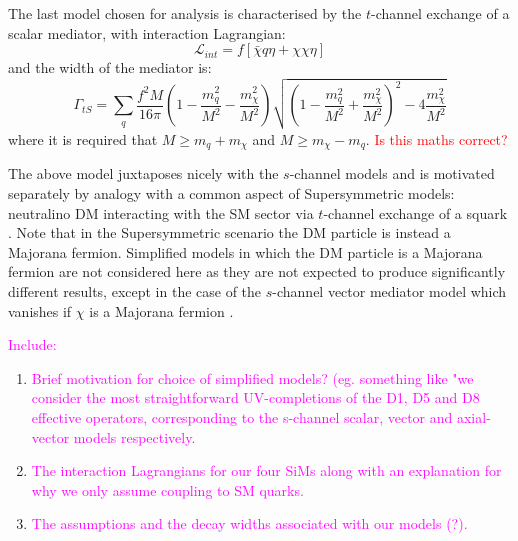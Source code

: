 \begin{flushleft}
\hspace{1cm}The last model chosen for analysis is characterised by the $t$-channel exchange of a scalar mediator, with interaction Lagrangian:
\begin{equation}
\label{L_int_tS}
\mathcal{L}_{int} = f \left[\bar{\chi}q\eta + \chi\chi\eta\right]
\end{equation}
and the width of the mediator is: 
\begin{equation}
\label{gamma_tS}
\Gamma_{tS} = \sum_{\substack{q}} \frac{f^{2}M}{16\pi}\left(1 - \frac{m_{q}^{2}}{M^{2}} - \frac{m_{\chi}^{2}}{M^{2}}\right)\sqrt{\left(1 - \frac{m_{q}^{2}}{M^{2}} + \frac{m_{\chi}^{2}}{M^{2}}\right)^{2} - 4\frac{m_{\chi}^{2}}{M^{2}}}
\end{equation}
where it is required that $M \geq m_{q} + m_{\chi}$ and $M \geq m_{\chi} - m_{q}$. \textcolor{red}{Is this maths correct?}

The above model juxtaposes nicely with the $s$-channel models and is motivated separately by analogy with a common aspect of Supersymmetric models: neutralino DM interacting with the SM sector via $t$-channel exchange of a squark \cite{SUSYDM}. Note that in the Supersymmetric scenario the DM particle is instead a Majorana fermion. Simplified models in which the DM particle is a Majorana fermion are not considered here as they are not expected to produce significantly different results, except in the case of the $s$-channel vector mediator model which vanishes if $\chi$ is a Majorana fermion \cite{METSig}.
\bigskip

\textcolor{magenta}{Include:}
\begin{enumerate}
\item \textcolor{magenta}{Brief motivation for choice of simplified models? (eg. something like "we consider the most straightforward UV-completions of the D1, D5 and D8 effective operators, corresponding to the s-channel scalar, vector and axial-vector models respectively.}
\item \textcolor{magenta}{The interaction Lagrangians for our four SiMs along with an explanation for why we only assume coupling to SM quarks.}
\item \textcolor{magenta}{The assumptions and the decay widths associated with our models (?).}
\end{enumerate}
\end{flushleft}


